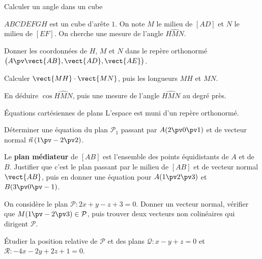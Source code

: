 \begin{exercice}[2]{Calculer un angle dans un cube}
\begin{codecote}[0.6]
$ABCDEFGH$ est un cube d'arête $1$. On note $M$ le milieu de $[AD]$ et $N$ le milieu de $[EF]$. On cherche une mesure de l'angle
$\widehat{HMN}$.
\begin{questions}
  \item Donner les coordonnées de $H$, $M$ et $N$ dans le repère orthonormé $\big(A\pv\vect{AB},\vect{AD},\vect{AE}\big)$.
  \item Calculer $\vect{MH}\cdot\vect{MN}$, puis les longueurs $MH$ et $MN$.
  \item En déduire $\cos\widehat{HMN}$, puis une mesure de l'angle $\widehat{HMN}$ au degré près.
\end{questions}
\cote
\centering
{}
\end{codecote}
\end{exercice}

\begin{exercice}[2]{Équations cartésiennes de plans}
L'espace est muni d'un repère orthonormé.
\begin{questions}
  \item Déterminer une équation du plan $\mathcal{P}_1$ passant par $A(2\pv0\pv1)$ et de vecteur normal $\vec n\,(1\pv-2\pv2)$.
  \item Le \textbf{plan médiateur} de $[AB]$ est l'ensemble des points équidistants de $A$ et de $B$. Justifier que c'est le plan passant
    par le milieu de $[AB]$ et de vecteur normal $\vect{AB}$, puis en donner une équation pour $A(1\pv2\pv3)$ et $B(3\pv0\pv-1)$.
  \item On considère le plan $\mathcal{P}:2x+y-z+3=0$. Donner un vecteur normal, vérifier que $M(1\pv-2\pv3)\in\mathcal{P}$, puis
    trouver deux vecteurs non colinéaires qui dirigent $\mathcal{P}$.
  \item Étudier la position relative de $\mathcal{P}$ et des plans $\mathcal{Q}:x-y+z=0$ et $\mathcal{R}:-4x-2y+2z+1=0$.
\end{questions}
\end{exercice}

